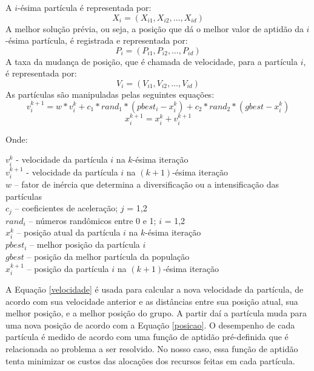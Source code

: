 \documentclass[a4paper,10pt]{article}
\begin{document}
A $i$-ésima partícula é representada por:
\begin{equation}
X_{i} = (X_{i1}, X_{i2},\ldots, X_{id})
\end{equation}
A melhor solução prévia, ou seja, a posição que dá o melhor valor de aptidão da $i$-ésima partícula, é registrada e representada por:
\begin{equation}
P_{i} = (P_{i1}, P_{i2},\ldots, P_{id})
\end{equation}
A taxa da mudança de posição, que é chamada de velocidade, para a partícula $i$, é representada por:
\begin{equation}
V_{i} = (V_{i1}, V_{i2},\ldots, V_{id})
\end{equation}
As partículas são manipuladas pelas seguintes equações:
\begin{equation}
v_{i}^{k+1} = w*v_{i}^k + c_{1}*rand_{1} * (pbest_{i} - x_{i}^k) + c_{2}*rand_{2} * (gbest - x_{i}^k) \label{velocidade}
\end{equation}
\begin{equation}
x_{i}^{k+1} = x_{i}^k + v_{i}^{k+1} \label{posicao}
\end{equation}

Onde:\\

\begin{description}
\item
$v_{i}^k$ - velocidade da partícula $i$ na $k$-ésima iteração\\
$v_{i}^{k+1}$ - velocidade da partícula $i$ na $(k+1)$-ésima iteração\\
$w$ – fator de inércia que determina a diversificação ou a intensificação das partículas\\
$c_{j}$ – coeficientes de aceleração; $j$ = 1,2\\
$rand_{i}$ – números randômicos entre 0 e 1; $i$ = 1,2\\
$x_{i}^k$ – posição atual da partícula $i$ na $k$-ésima iteração\\
$pbest_{i}$ – melhor posição da partícula $i$\\
$gbest$ – posição da melhor partícula da população\\
$x_{i}^{k+1}$ – posição da partícula $i$ na $(k+1)$-ésima iteração\\
\end{description}

A Equação \eqref{velocidade} é usada para calcular a nova velocidade da partícula, de acordo com sua velocidade 
anterior e as distâncias entre sua posição atual, sua melhor posição, e a melhor posição do grupo. 
A partir daí a partícula muda para uma nova posição de acordo com a Equação \eqref{posicao}. O desempenho de cada 
partícula é medido de acordo com uma função de aptidão pré-definida que é relacionada ao problema a ser 
resolvido. No nosso caso, essa função de aptidão tenta minimizar os custos das alocações dos 
recursos feitas em cada partícula.\\
\end{document}
